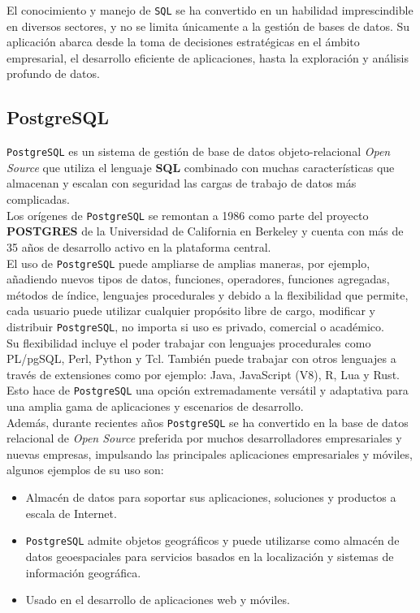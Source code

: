 El conocimiento y manejo de \texttt{SQL} se ha convertido en un habilidad imprescindible en diversos sectores, y no se limita únicamente a la gestión de bases de datos. Su aplicación abarca desde la toma de decisiones estratégicas en el ámbito empresarial, el desarrollo eficiente de aplicaciones, hasta la exploración y análisis profundo de datos.


\subsection{PostgreSQL}

\texttt{PostgreSQL} es un sistema de gestión de base de datos objeto-relacional \textit{Open Source} que utiliza el lenguaje \textbf{SQL} combinado con muchas características que almacenan y escalan con seguridad las cargas de trabajo de datos más complicadas. \\
Los orígenes de \texttt{PostgreSQL} se remontan a 1986 como parte del proyecto \textbf{POSTGRES} de la Universidad de California en Berkeley y cuenta con más de 35 años de desarrollo activo en la plataforma central.\\

El uso de \texttt{PostgreSQL} puede ampliarse de amplias maneras, por ejemplo, añadiendo nuevos tipos de datos, funciones, operadores, funciones agregadas, métodos de índice, lenguajes procedurales y debido a la flexibilidad que permite, cada usuario puede utilizar cualquier propósito libre de cargo, modificar y distribuir \texttt{PostgreSQL}, no importa si uso es privado, comercial o académico.\\
Su flexibilidad incluye el poder trabajar con lenguajes procedurales como PL/pgSQL, Perl, Python y Tcl. También puede trabajar con otros lenguajes a través de extensiones como por ejemplo: Java, JavaScript (V8), R, Lua y Rust.\\
Esto hace de \texttt{PostgreSQL} una opción extremadamente versátil y adaptativa para una amplia gama de aplicaciones y escenarios de desarrollo.\\
Además, durante recientes años \texttt{PostgreSQL} se ha convertido en la base de datos relacional de \textit{Open Source} preferida por muchos desarrolladores empresariales y nuevas empresas, impulsando las principales aplicaciones empresariales y móviles, algunos ejemplos de su uso son:

\begin{itemize}
    \item Almacén de datos para soportar sus aplicaciones, soluciones y productos a escala de Internet.

    \item \texttt{PostgreSQL} admite objetos geográficos y puede utilizarse como almacén de datos geoespaciales para servicios basados en la localización y sistemas de información geográfica.

    \item Usado en el desarrollo de aplicaciones web y móviles.
\end{itemize}


